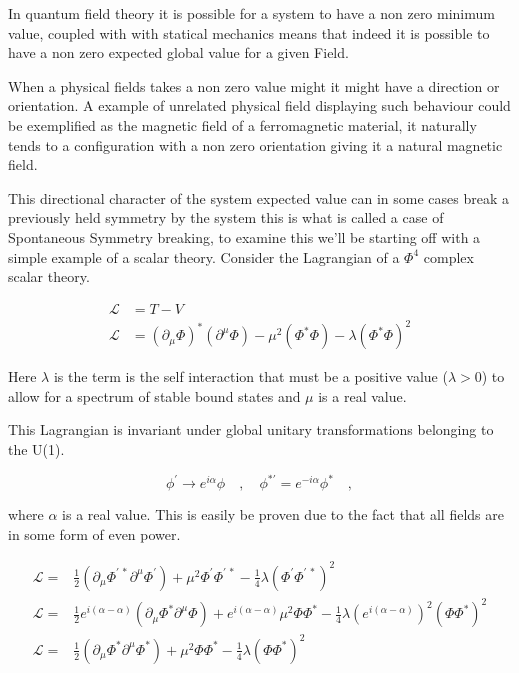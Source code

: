 \documentclass[11pt,twoside,a4paper]{article}
\begin{document}
In quantum field theory it is possible for a system to have a non zero minimum value, coupled with with statical mechanics means that indeed it is possible to have a non zero expected global value for a given Field.

When a physical fields takes a non zero value might it might have a direction or orientation. A example of unrelated physical field displaying such behaviour could be exemplified as the magnetic field of a ferromagnetic material, it naturally tends to a configuration with a non zero orientation giving it a natural magnetic field.  

This directional character of the system expected value can in some cases break a previously held symmetry by the system this is what is called a case of Spontaneous Symmetry breaking, to examine this we'll be starting off with a simple example of a scalar theory. Consider the Lagrangian of a $\Phi^4$ complex scalar theory.

\begin{align}
\mathcal{L} & =T - V \\ 
\mathcal{L} & =(\partial_\mu \Phi)^* ( \partial^\mu \Phi) -  \mu^2 (\Phi^* \Phi) - \lambda (\Phi^* \Phi)^2
\end{align}

Here $\lambda$ is the term is the self interaction that must be a positive value ($\lambda > 0$) to allow for a spectrum of stable bound states and $\mu$ is a real value.

This Lagrangian is invariant under global unitary transformations belonging to the U(1).

\begin{equation}
\phi^\prime \rightarrow e^{i\alpha} \phi \quad  , \quad \phi^{* \prime}=e^{-i \alpha} \phi^* \quad ,
\end{equation} 

where $\alpha$ is a real value. This is easily be proven due to the fact that all fields are in some form of even power. 

\begin{align}
\mathcal{L} =& \frac{1}{2}(\partial_\mu \Phi^{\prime \, *} \partial^\mu \Phi^{\prime} ) +  \mu^2 \Phi^\prime \Phi^{\prime \, *} - \frac{1}{4} \lambda (\Phi^\prime \Phi^{\prime \, *})^2	\\
\mathcal{L} =& \frac{1}{2}e^{i(\alpha-\alpha)}(\partial_\mu \Phi^{*} \partial^\mu \Phi ) +  e^{i(\alpha-\alpha)} \mu^2 \Phi \Phi^* - \frac{1}{4} \lambda (e^{i(\alpha-\alpha)})^2(\Phi \Phi^{*})^2	\\
\mathcal{L} =& \frac{1}{2}(\partial_\mu \Phi^{*} \partial^\mu \Phi^{*} ) +  \mu^2 \Phi \Phi^* - \frac{1}{4} \lambda (\Phi \Phi^{*})^2	\\
\end{align} 
\end{document}
